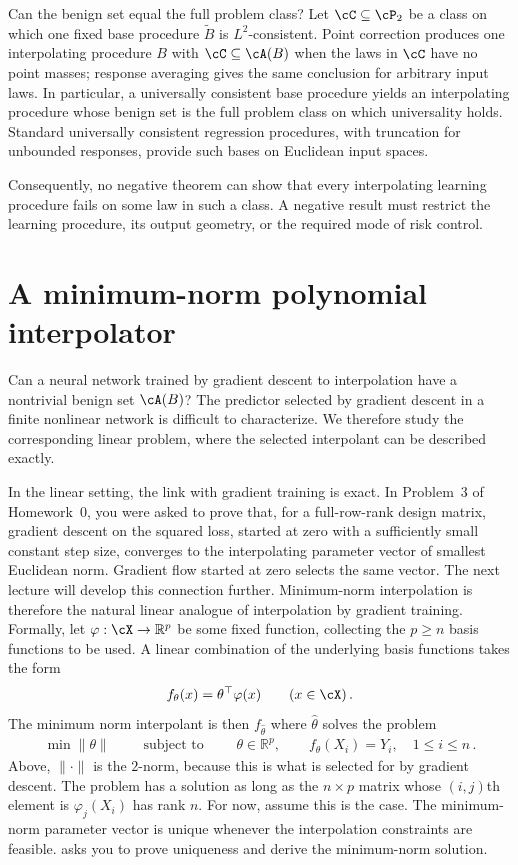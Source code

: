 \documentclass[11pt,twoside]{article}
\newcommand{\R}{\mathbb R}
\theoremstyle{definition}
\theoremstyle{remark}
\begin{document}
Can the benign set equal the full problem class? Let
$\cC\subseteq\cP_2$ be a
class on which one fixed base procedure $\widetilde B$ is $L^2$-consistent.
Point correction produces one interpolating procedure $B$ with
$\cC\subseteq\cA(B)$ when the laws in $\cC$ have no point masses; response
averaging gives the same conclusion for arbitrary input laws. In particular,
a universally consistent base procedure yields an interpolating procedure
whose benign set is the full problem class on which universality holds.
Standard universally consistent regression procedures, with truncation for
unbounded responses, provide such bases on Euclidean input spaces.

Consequently, no negative theorem can show that every interpolating learning
procedure fails on some law in such a class. A negative result must restrict
the learning procedure, its output geometry, or the required mode of risk
control.

\section{A minimum-norm polynomial interpolator}
\label{sec:series}

Can a neural network trained by gradient descent to interpolation have a
nontrivial benign set $\cA(B)$? The predictor selected by gradient descent in
a finite nonlinear network is difficult to characterize. We therefore study
the corresponding linear problem, where the selected interpolant can be
described exactly.

In the linear setting, the link with gradient training is exact. In
Problem~3 of Homework~0, you were asked to prove that, for a full-row-rank
design matrix, gradient descent on the squared loss, started at zero with
a sufficiently small constant step size, converges to the interpolating
parameter vector of smallest Euclidean norm. Gradient flow started at zero
selects the same vector. The next lecture will develop this connection further.
Minimum-norm interpolation is
therefore the natural linear analogue of interpolation by gradient training.
Formally, let $\varphi: \cX \to \R^p$ be some fixed function, collecting
the $p\ge n$ basis functions to be used. A linear combination of the underlying
basis functions takes the form 
\[
f_\theta(x) = \theta^\top \varphi(x)\qquad (x\in \cX)\,.
\]
The minimum norm interpolant is then $f_{\hat\theta}$ where 
$\hat\theta$ solves the problem
\begin{align}
\min \|\theta\| \qquad \text{ subject to } \qquad \theta\in \R^p, \qquad
f_\theta(X_i)=Y_i,\quad 1\le i \le n\,.
\label{eq:minnorm}
\end{align}
Above, $\|\cdot\|$ is the $2$-norm, because this is what is selected for by
gradient descent.
The problem has a solution as long as the $n\times p$ matrix whose $(i,j)$th
element is $\varphi_j(X_i)$ has rank $n$. For now, assume this is the case.
The minimum-norm parameter vector is unique whenever the interpolation
constraints are feasible.
 asks you to prove uniqueness and derive the
minimum-norm solution.
\end{document}
